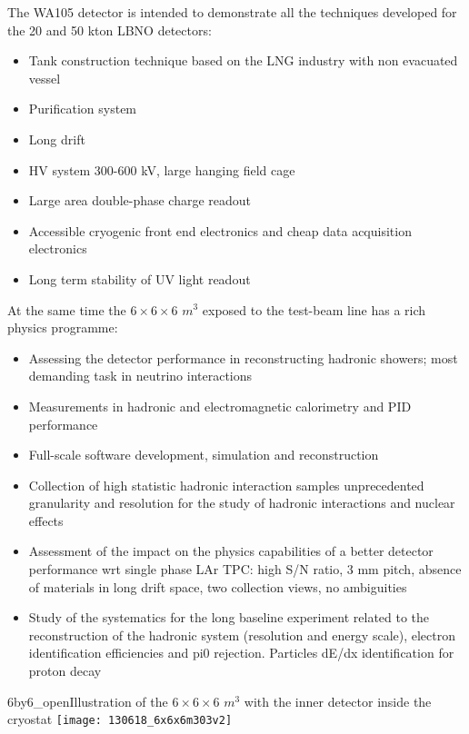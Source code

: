 The WA105 detector is intended to demonstrate all the techniques developed for the 20 and 50 kton LBNO detectors:

\begin{itemize}
\item{Tank construction technique based on the LNG industry with non evacuated vessel}
\item{Purification system}
\item{Long drift}
\item{HV system 300-600 kV, large hanging field cage}
\item{Large area double-phase charge readout}
\item{Accessible cryogenic front end electronics and cheap data acquisition electronics}
\item{Long term stability of UV light readout}
\end{itemize}

At the same time the $6\times 6\times 6$ $m^3$ exposed to the test-beam line has a rich physics programme:

\begin{itemize}
\item{Assessing the detector performance in reconstructing hadronic showers; most demanding task in neutrino interactions}
\item{ Measurements in hadronic and electromagnetic calorimetry and PID performance}
\item{Full-scale software development, simulation and reconstruction}
\item{Collection of high statistic hadronic interaction samples  unprecedented granularity and resolution for the study of hadronic interactions and nuclear effects}
\item{Assessment of the impact on the physics capabilities of a better detector performance wrt  single phase LAr TPC: high S/N ratio, 3 mm pitch, absence of materials in long drift space, two collection views, no ambiguities}
\item{Study of the systematics for the long baseline experiment related to the reconstruction of the hadronic system (resolution and energy scale), electron identification efficiencies and pi0 rejection. Particles dE/dx identification for proton decay}
\end{itemize}


\begin{cdrfigure}{6by6_open}{Illustration of the  $6\times 6\times 6$ $m^3$  with the inner detector inside the cryostat}
\texttt{[image: 130618\_6x6x6m303v2]}
\end{cdrfigure}


